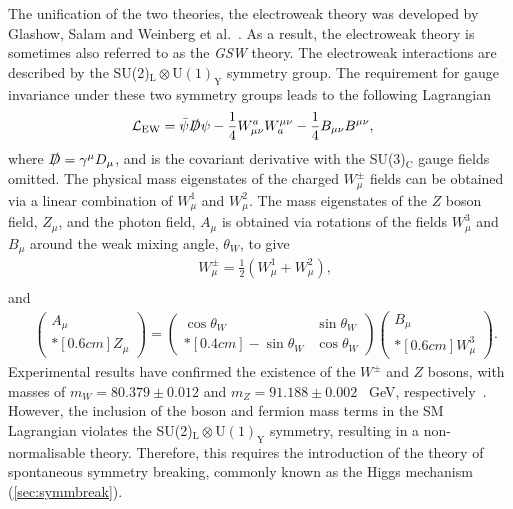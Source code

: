 The unification of the two theories, the electroweak theory was developed by Glashow, Salam and Weinberg et al.~\cite{Glashow1959,Salam1959,Weinberg1967}. As a result, the electroweak theory is sometimes also referred to as the \emph{GSW} theory. The electroweak interactions are described by the SU(2)$_\mathrm{L}\otimes\mathrm{U(1)}_\mathrm{Y}$ symmetry group. The requirement for gauge invariance under these two symmetry groups leads to the following Lagrangian
\begin{equation}
    \label{eq:lagrangianEW}
    \begin{aligned}
        & \mathcal{L}_\mathrm{EW} = \bar{\psi}\slashed{D}\psi - \frac{1}{4}W^a_{\mu\nu}W_a^{\mu\nu} - \frac{1}{4}B_{\mu\nu}B^{\mu\nu},
     \end{aligned}
\end{equation}
where $\slashed{D} = \gamma^\mu D_\mu$, and is the covariant derivative with the SU(3)$_\mathrm{C}$ gauge fields omitted. The physical mass eigenstates of the charged $W^\pm_\mu$ fields can be obtained via a linear combination of $W^1_\mu$ and $W^2_\mu$. The mass eigenstates of the $Z$ boson field, $Z_\mu$, and the photon field, $A_\mu$ is obtained via rotations of the fields $W_\mu^3$ and $B_\mu$ around the weak mixing angle, $\theta_W$, to give
\begin{equation}\renewcommand*{\arraystretch}{\newarraystrech}
    \label{eq:wbosonFields}
    \begin{aligned}
        & W^\pm_\mu = \frac{1}{2} \left(W^1_\mu + W^2_\mu \right), \\
     \end{aligned}
\end{equation}
and 
\begin{equation}\renewcommand*{\arraystretch}{\newarraystrech}
    \label{eq:zbosonFields}
    \begin{aligned}
        & \begin{pmatrix}
            A_\mu \\*[0.6cm]
            Z_\mu
        \end{pmatrix} = \begin{pmatrix}
            \cos \theta_W & \sin \theta_W \\*[0.4cm]
            -\sin \theta_W & \cos \theta_W
        \end{pmatrix} \begin{pmatrix}
            B_\mu \\*[0.6cm]
            W_\mu^3
        \end{pmatrix}.
     \end{aligned}
\end{equation}
Experimental results have confirmed the existence of the $W^\pm$ and $Z$ bosons, with masses of $m_W = 80.379 \pm 0.012$ and $m_Z = 91.188 \pm 0.002$ \SI{}{\giga\electronvolt}, respectively~\cite{PDG}. However, the inclusion of the boson and fermion mass terms in the SM Lagrangian violates the SU(2)$_\mathrm{L} \otimes \mathrm{U(1)}_\mathrm{Y}$ symmetry, resulting in a non-normalisable theory. Therefore, this requires the introduction of the theory of spontaneous symmetry breaking, commonly known as the Higgs mechanism (\cref{sec:symmbreak}).

